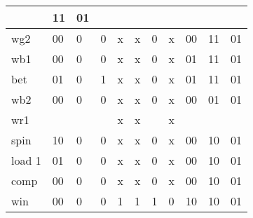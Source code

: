 \begin{enumerate}
\begin{onlysolution}[fragile]
{{\begin{tabular}{l|l|l|l|l|l|l|l|l|l|l}
                        & 11       & 01                                                                              \\ \hline
                        wg2    & 00       & 0      & 0      & x         & x            & 0      & x       & 00
                        & 11       & 01                                                                              \\ \hline
                        wb1    & 00       & 0      & 0      & x         & x            & 0      & x       & 01
                        & 11       & 01                                                                              \\ \hline
                        bet    & 01       & 0      & 1      & x         & x            & 0      & x       & 01
                        & 11       & 01                                                                              \\ \hline
                        wb2    & 00       & 0      & 0      & x         & x            & 0      & x       & 00
                        & 01       & 01                                                                              \\ \hline
                        wr1    &          &        &        & x         & x            &        & x       &
                        &          &                                                                                 \\ \hline
                        spin   & 10       & 0      & 0      & x         & x            & 0      & x       & 00
                        & 10       & 01                                                                              \\ \hline
                        load 1 & 01       & 0      & 0      & x         & x            & 0      & x       & 00
                        & 10       & 01                                                                              \\ \hline
                        comp   & 00       & 0      & 0      & x         & x            & 0      & x       & 00
                        & 10       & 01                                                                              \\ \hline
                        win    & 00       & 0      & 0      & 1         & 1            & 1      & 0       & 10
                        & 10       & 01                                                                              \\ \hline

\end{tabular}}}
\end{onlysolution}
\end{enumerate}
